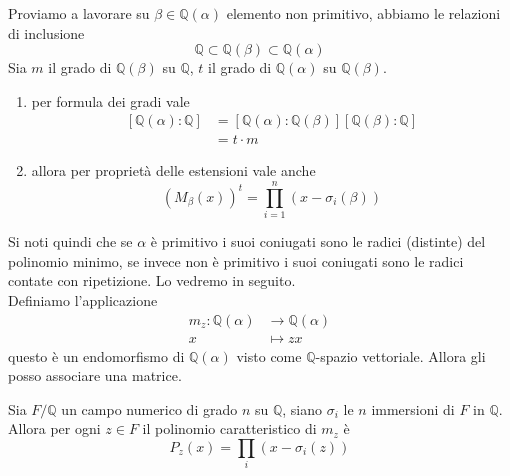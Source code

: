 \begin{osservazione}
	Proviamo a lavorare su $\beta\in\mathbb{Q}(\alpha)$ elemento non primitivo, abbiamo le relazioni di inclusione 
	\begin{equation*}
	\mathbb{Q}\subset\mathbb{Q}(\beta)\subset\mathbb{Q}(\alpha)
	\end{equation*}
	Sia $m$ il grado di $\mathbb{Q}(\beta)$ su $\mathbb{Q}$, $t$ il grado di $\mathbb{Q}(\alpha)$ su $\mathbb{Q}(\beta)$. 
	\begin{enumerate}
		\item per formula dei gradi vale 
		\begin{align*}
		\left[\mathbb{Q}(\alpha):\mathbb{Q}\right]&=\left[\mathbb{Q}(\alpha):\mathbb{Q}(\beta)\right]\left[\mathbb{Q}(\beta):\mathbb{Q}\right]\\
		&=t\cdot m
		\end{align*}
		\item allora per proprietà delle estensioni vale anche 
		\begin{equation*}
		\left(M_\beta(x)\right)^t=\prod_{i=1}^n\left(x-\sigma_i(\beta)\right)
		\end{equation*}
	\end{enumerate}
	Si noti quindi che se $\alpha$ è primitivo i suoi coniugati sono le radici (distinte) del polinomio minimo, se invece non è primitivo i suoi coniugati sono le radici contate con ripetizione. Lo vedremo in seguito. \\
	Definiamo l'applicazione 
	\begin{align*}
	m_z:\mathbb{Q}(\alpha)&\longrightarrow\mathbb{Q}(\alpha)\\
	x&\longmapsto zx
	\end{align*}
	questo è un endomorfismo di $\mathbb{Q}(\alpha)$ visto come $\mathbb{Q}$-spazio vettoriale. Allora gli posso associare una matrice.
\end{osservazione}
\begin{proposizione}
	Sia $F/\mathbb{Q}$ un campo numerico di grado $n$ su $\mathbb{Q}$, siano $\sigma_i$ le $n$ immersioni di $F$ in $\mathbb{Q}$. Allora per ogni $z\in F$ il polinomio caratteristico di $m_z$ è
	\begin{equation*}
	P_z(x)=\prod_i\left(x-\sigma_i(z)\right)
	\end{equation*}
\end{proposizione}
